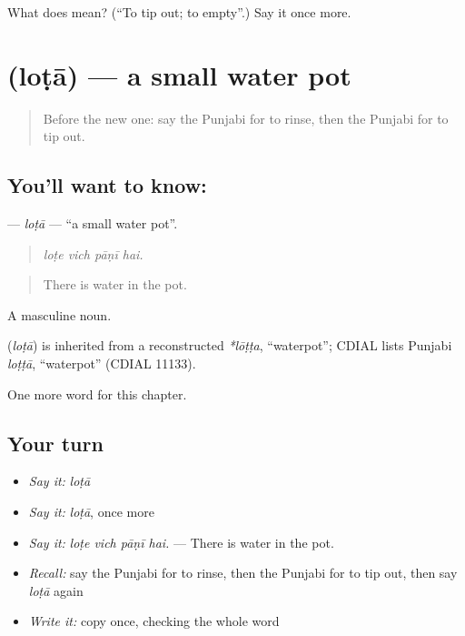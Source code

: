 \begin{tcolorbox}[breakable,colback=teal!4,colframe=teal!35!black,title={Before you move on}]
What does  mean? (\textquotedblleft{}To tip out; to empty\textquotedblright{}.) Say it once more.
\end{tcolorbox}
\section[\texorpdfstring{\pa{ਲੋਟਾ} (loṭā)}{ਲੋਟਾ (loṭā)}]{ (loṭā) — a small water pot}

\label{lesson:PA-C236-lota}



\begin{quote}
Before the new one: say the Punjabi for to rinse, then the Punjabi for to tip out.
\end{quote}

\subsection*{You'll want to know: }
\textbf{} — \emph{loṭā} — \textquotedblleft{}a small water pot\textquotedblright{}.

\begin{quote}
   
\end{quote}

\begin{quote}
\emph{loṭe vich pāṇī hai.}
\end{quote}

\begin{quote}
There is water in the pot.
\end{quote}

A masculine noun.

\begin{cousinweb}
\textbf{} (\emph{loṭā}) is inherited from a reconstructed \emph{*lōṭṭa}, \textquotedblleft{}waterpot\textquotedblright{}; CDIAL lists Punjabi \emph{loṭṭā}, \textquotedblleft{}waterpot\textquotedblright{} (CDIAL 11133).
\end{cousinweb}

\begin{grammarlens}[title={What you've built}]
One more word for this chapter.
\end{grammarlens}

\subsection*{Your turn}
\begin{itemize}
\raggedright
  \item \emph{Say it:} \emph{loṭā}
  \item \emph{Say it:} \emph{loṭā}, once more
  \item \emph{Say it:} \emph{loṭe vich pāṇī hai.} — There is water in the pot.
  \item \emph{Recall:} say the Punjabi for to rinse, then the Punjabi for to tip out, then say \emph{loṭā} again
  \item \emph{Write it:} copy \textbf{} once, checking the whole word
\end{itemize}

